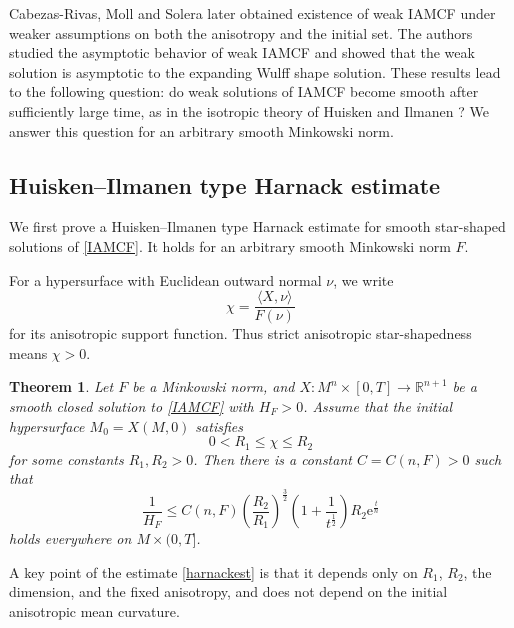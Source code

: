 \documentclass[11pt,reqno]{amsart}
\newtheorem{theorem}[proposition]{Theorem}
\theoremstyle{definition}
\theoremstyle{remark}
\numberwithin{equation}{section}
\begin{document}
	Cabezas-Rivas, Moll and Solera \cite{CMS24} later obtained existence of weak IAMCF under weaker assumptions on both the anisotropy and the initial set. The authors \cite{GWZ26} studied the asymptotic behavior of weak IAMCF and showed that the weak solution is asymptotic to the expanding Wulff shape solution. These results lead to the following question: do weak solutions of IAMCF become smooth after sufficiently large time, as in the isotropic theory of Huisken and Ilmanen \cite{HI08}? We answer this question for an arbitrary smooth Minkowski norm.


	\subsection{Huisken--Ilmanen type Harnack estimate}
	\label{subsec:harnack-intro}
We first prove a Huisken--Ilmanen type Harnack estimate for smooth star-shaped solutions of \eqref{IAMCF}. It holds for an arbitrary smooth Minkowski norm $F$.
	
	For a hypersurface with Euclidean outward normal $\nu$, we write
	\begin{equation*}
		\chi=\frac{\langle X,\nu\rangle}{F(\nu)}
	\end{equation*}
	for its anisotropic support function. Thus strict anisotropic star-shapedness means $\chi>0$.
	
	\begin{theorem}
		\label{prop-harnack}
		Let $F$ be a Minkowski norm, and $X:M^n\times[0,T]\to\mathbb{R}^{n+1}$ be a smooth closed solution to \eqref{IAMCF} with $H_F>0$. Assume that the initial hypersurface $M_0=X(M,0)$ satisfies
		\begin{equation*}
			0< R_1 \leq \chi \leq R_2
		\end{equation*}
		for some constants $R_1,R_2>0$. Then there is a constant $C=C(n,F)>0$ such that
		\begin{equation}
			\label{harnackest}
			\dfrac{1}{H_F} \leq C(n,F)\left( \dfrac{R_2}{R_1} \right)^{\frac{3}{2}}\left( 1 + \dfrac{1}{t^{\frac{1}{2}}} \right)R_2\mathrm{e}^{\frac{t}{n}}
		\end{equation}
		holds everywhere on $M\times(0,T]$.
	\end{theorem}

	A key point of the estimate \eqref{harnackest} is that it  depends only on $R_1$, $R_2$, the dimension, and the fixed anisotropy, and does not depend on the initial anisotropic mean curvature. 
 
\end{document}

